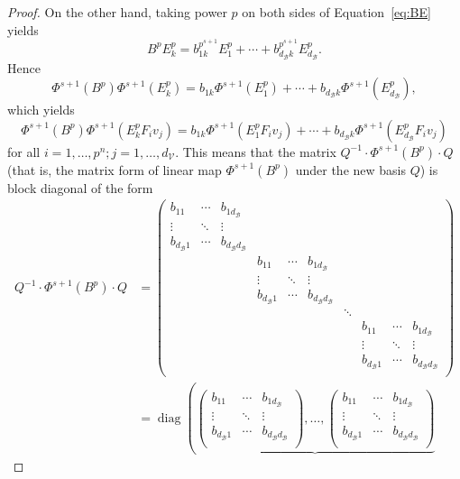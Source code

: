 \documentclass[letterpaper, 11pt, thm-restate]{article}
\numberwithin{equation}{section}
\newcommand{\diag}{\operatorname{diag}}
\newcommand{\mV}{\mathcal{V}}
\newcommand{\mB}{\mathcal{B}}
\theoremstyle{definition}
\theoremstyle{definition}
\theoremstyle{definition}
\begin{document}
\begin{proof}
    On the other hand, taking power $p$ on both sides of Equation~\eqref{eq:BE} yields 
    \[
    B^p E_k^p = b_{1k}^{p^{s+1}} E_1^p + \cdots + b_{d_{\mB} k}^{p^{s+1}} E_{d_{\mB}}^p.
    \]
    Hence
    \[
    \Phi^{s+1}(B^p) \Phi^{s+1}(E_k^p) = b_{1k} \Phi^{s+1}(E_1^p) + \cdots + b_{d_{\mB} k} \Phi^{s+1}(E_{d_{\mB}}^p),
    \]
    which yields
    \[
    \Phi^{s+1}(B^p) \Phi^{s+1}(E_k^p F_i v_j) = b_{1k} \Phi^{s+1}(E_1^p F_i v_j) + \cdots + b_{d_{\mB} k} \Phi^{s+1}(E_{d_{\mB}}^p F_i v_j)
    \]
    for all $i = 1, \ldots, p^n; j = 1, \ldots, d_{\mV}$.
    This means that the matrix $Q^{-1} \cdot \Phi^{s+1}(B^p) \cdot Q$ (that is, the matrix form of linear map $\Phi^{s+1}(B^p)$ under the new basis $Q$) is block diagonal of the form
    \begin{align}\label{eq:QBQ}
    Q^{-1} \cdot \Phi^{s+1}(B^p) \cdot Q & =
    \begin{pmatrix}
        b_{11} & \cdots & b_{1d_{\mB}} &   &   &   &   &   &   &   \\
        \vdots & \ddots & \vdots&&&&&&& \\
        b_{d_{\mB}1} & \cdots & b_{d_{\mB}d_{\mB}} & &&&&&& \\
        &&& b_{11} & \cdots & b_{1d_{\mB}} \\
        &&&\vdots & \ddots & \vdots \\
        &&& b_{d_{\mB}1} & \cdots & b_{d_{\mB}d_{\mB}} \\
        &&&&&&\ddots \\
        &&&&&&& b_{11} & \cdots & b_{1d_{\mB}} \\
        &&&&&&& \vdots & \ddots & \vdots \\
        &&&&&&& b_{d_{\mB}1} & \cdots & b_{d_{\mB}d_{\mB}} \\
    \end{pmatrix} \nonumber \\
    & = \diag \left(\underbrace{
    \begin{pmatrix}
        b_{11} & \cdots & b_{1d_{\mB}}   \\
        \vdots & \ddots & \vdots \\
        b_{d_{\mB}1} & \cdots & b_{d_{\mB}d_{\mB}}\\
    \end{pmatrix}, \ldots,
    \begin{pmatrix}
        b_{11} & \cdots & b_{1d_{\mB}}   \\
        \vdots & \ddots & \vdots \\
        b_{d_{\mB}1} & \cdots & b_{d_{\mB}d_{\mB}}\\

\end{pmatrix}}
\end{align}
\end{proof}
\end{document}
